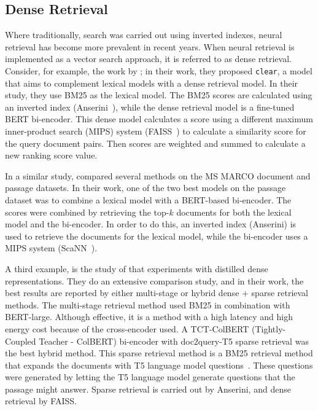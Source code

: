 \subsection{Dense Retrieval}
Where traditionally, search was carried out using inverted indexes, neural retrieval has become more prevalent in recent years. When neural retrieval \citep{neural-ir} is implemented as a vector search approach, it is referred to as dense retrieval.
Consider, for example, the work by \citet{dense-retrieval-1}; in their work, they proposed \texttt{clear}, a model that aims to complement lexical models with a dense retrieval model. In their study, they use BM25 as the lexical model. The BM25 scores are calculated using an inverted index (Anserini~\citep{anserini}), while the dense retrieval model is a fine-tuned BERT bi-encoder. This dense model calculates a score using a different maximum inner-product search (MIPS) system (FAISS~\citep{faiss}) to calculate a similarity score for the query document pairs. Then scores are weighted and summed to calculate a new ranking score value. 

In a similar study, \citet{dense-retrieval-2} compared several methods on the MS MARCO document and passage datasets. In their work, one of the two best models on the passage dataset was to combine a lexical model with a BERT-based bi-encoder. The scores were combined by retrieving the top-$k$ documents for both the lexical model and the bi-encoder. In order to do this, an inverted index (Anserini) is used to retrieve the documents for the lexical model, while the bi-encoder uses a MIPS system (ScaNN~\citep{scann}).

A third example, is the study of  \citet{dense-retrieval-3} that experiments with distilled dense representations. They do an extensive comparison study, and in their work, the best results are reported by either multi-stage or hybrid dense + sparse retrieval methods. The multi-stage retrieval method used BM25 in combination with BERT-large. Although effective, it is a method with a high latency and high energy cost because of the cross-encoder used. A TCT-ColBERT (Tightly-Coupled Teacher - ColBERT) bi-encoder with doc2query-T5 sparse retrieval was the best hybrid method. This sparse retrieval method is a BM25 retrieval method that expands the documents with T5 language model questions~\citep{2020t5}. These questions were generated by letting the T5 language model generate questions that the passage might answer. Sparse retrieval is carried out by Anserini, and dense retrieval by FAISS. 

